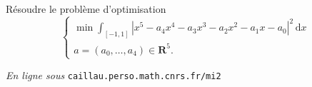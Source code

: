 \documentclass[11pt,a4paper]{article}
\def\R{\mathbf{R}}
\begin{document}
\enlargethispage{1cm}
\begin{Exercice} R\'esoudre le probl\`eme d'optimisation
$$ \left\{ \begin{array}{l}
  \min \int_{[-1,1]} |x^5-a_4 x^4-a_3 x^3-a_2 x^2-a_1 x-a_0|^2\,\mathrm{d}x\\
  a=(a_0,\dots,a_4) \in \R^5.
\end{array} \right. $$
\end{Exercice} \vspace*{1em}

\vfill \begin{flushright}{\footnotesize \emph{En ligne sous}
\texttt{caillau.perso.math.cnrs.fr/mi2}} \end{flushright}
\end{document}
